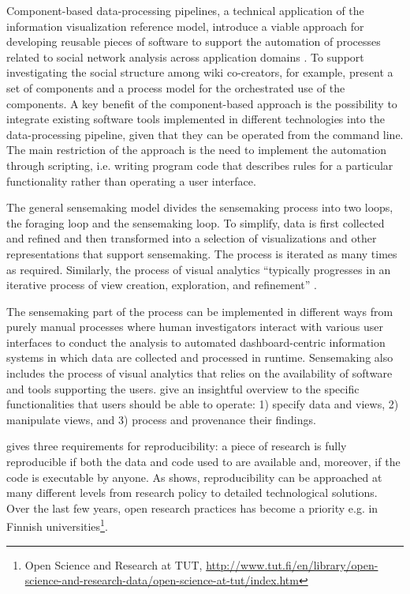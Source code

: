 Component-based data-processing pipelines, a technical application of the information visualization reference model, introduce a viable approach for developing reusable pieces of software to support the automation of processes related to social network analysis across application domains \citep{Nykanen2008,Huhtamaki2010Context-DrivenCo-Creation}. To support investigating the social structure among wiki co-creators, for example, \cite{Huhtamaki2010Context-DrivenCo-Creation} present a set of components and a process model for the orchestrated use of the components. A key benefit of the component-based approach \citep{Nykanen2008} is the possibility to integrate existing software tools implemented in different technologies into the data-processing pipeline, given that they can be operated from the command line. The main restriction of the approach is the need to implement the automation through scripting, i.e. writing program code that describes rules for a particular functionality rather than operating a user interface.

The general sensemaking model \citep{Pirolli2005TheAnalysis} divides the sensemaking process into two loops, the foraging loop and the sensemaking loop. To simplify, data is first collected and refined and then transformed into a selection of visualizations and other representations that support sensemaking. The process is iterated as many times as required. Similarly, the process of visual analytics ``typically progresses in an iterative process of view creation, exploration, and refinement'' \citep{Heer2012InteractiveAnalysis}. 

The sensemaking part of the process can be implemented in different ways from purely manual processes where human investigators interact with various user interfaces to conduct the analysis to automated dashboard-centric information systems in which data are collected and processed in runtime. Sensemaking also includes the process of visual analytics \citep{Wong2004VisualAnalytics,Keim2010MasteringAnalytics} that relies on the availability of software and tools supporting the users. \cite{Heer2012InteractiveAnalysis} give an insightful overview to the specific functionalities that users should be able to operate: 1) specify data and views, 2) manipulate views, and 3) process and provenance their findings.

\cite{Peng2009} gives three requirements for reproducibility: a piece of research is fully reproducible if both the data and code used to are available and, moreover, if the code is executable by anyone. As \cite{Ghosh2013} shows, reproducibility can be approached at many different levels from research policy to detailed technological solutions. Over the last few years, open research practices has become a priority e.g. in Finnish universities\footnote{Open Science and Research at TUT, \url{http://www.tut.fi/en/library/open-science-and-research-data/open-science-at-tut/index.htm}}.


